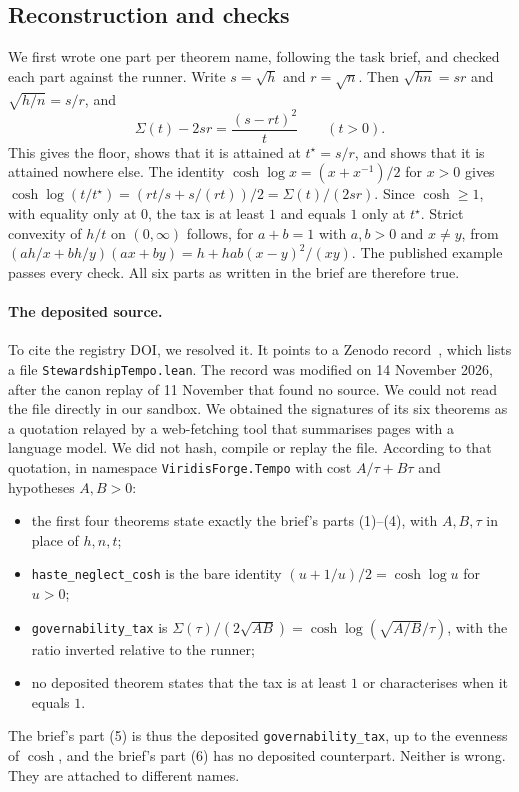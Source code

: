 \documentclass[11pt]{article}
\theoremstyle{definition}
\theoremstyle{remark}
\begin{document}
\subsection{Reconstruction and checks}
We first wrote one part per theorem name, following the task brief, and checked each part against the runner.
Write $s=\sqrt h$ and $r=\sqrt n$. Then $\sqrt{hn}=sr$ and $\sqrt{h/n}=s/r$, and
\[
\Sigma(t)-2sr=\frac{(s-rt)^2}{t}\qquad(t>0).
\]
This gives the floor, shows that it is attained at $t^\star=s/r$, and shows that it is attained nowhere else.
The identity $\cosh\log x=(x+x^{-1})/2$ for $x>0$ gives
$\cosh\log(t/t^\star)=(rt/s+s/(rt))/2=\Sigma(t)/(2sr)$. Since $\cosh\ge1$, with equality only at $0$, the tax is at least $1$ and equals $1$ only at $t^\star$.
Strict convexity of $h/t$ on $(0,\infty)$ follows, for $a+b=1$ with $a,b>0$ and $x\ne y$, from
$(ah/x+bh/y)(ax+by)=h+hab(x-y)^2/(xy)$.
The published example passes every check. All six parts as written in the brief are therefore true.

\paragraph{The deposited source.}
To cite the registry DOI, we resolved it. It points to a Zenodo record~\cite{HartTempo2026}, which lists a file \texttt{StewardshipTempo.lean}.
The record was modified on 14 November 2026, after the canon replay of 11 November that found no source.
We could not read the file directly in our sandbox. We obtained the signatures of its six theorems as a quotation relayed by
a web-fetching tool that summarises pages with a language model. We did not hash, compile or replay the file.
According to that quotation, in namespace \texttt{ViridisForge.Tempo} with cost $A/\tau+B\tau$ and hypotheses $A,B>0$:
\begin{itemize}
\item the first four theorems state exactly the brief's parts (1)--(4), with $A,B,\tau$ in place of $h,n,t$;
\item \texttt{haste\_neglect\_cosh} is the bare identity $(u+1/u)/2=\cosh\log u$ for $u>0$;
\item \texttt{governability\_tax} is $\Sigma(\tau)/(2\sqrt{AB})=\cosh\log(\sqrt{A/B}/\tau)$, with the ratio inverted relative to the runner;
\item no deposited theorem states that the tax is at least $1$ or characterises when it equals $1$.
\end{itemize}
The brief's part (5) is thus the deposited \texttt{governability\_tax}, up to the evenness of $\cosh$, and the brief's part (6) has no deposited counterpart.
Neither is wrong. They are attached to different names.
\end{document}
